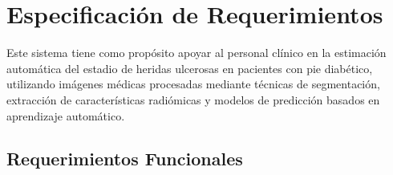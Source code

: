 \section{Especificación de Requerimientos}
\label{sc:ER}

Este sistema tiene como propósito apoyar al personal clínico en la estimación automática del estadio de heridas ulcerosas en pacientes con pie diabético, utilizando imágenes médicas procesadas mediante técnicas de segmentación, extracción de características radiómicas y modelos de predicción basados en aprendizaje automático.


\subsection{Requerimientos Funcionales}
\label{ssc:RF}

